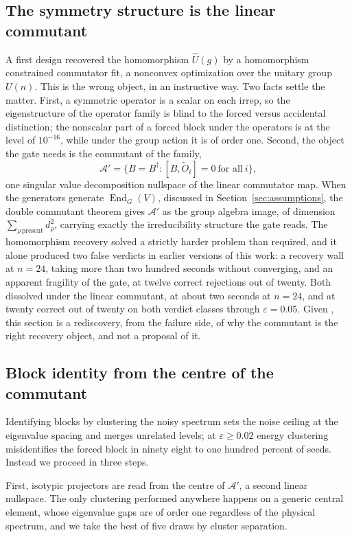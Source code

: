 \documentclass[11pt]{article}
\newcommand{\comm}[2]{[#1,#2]}
\newcommand{\End}{\operatorname{End}}
\begin{document}
\subsection{The symmetry structure is the linear commutant}
A first design recovered the homomorphism $\hat U(g)$ by a homomorphism
constrained commutator fit, a nonconvex optimization over the unitary group
$U(n)$. This is the wrong object, in an instructive way. Two facts settle the
matter. First, a symmetric operator is a scalar on each irrep, so the
eigenstructure of the operator family is blind to the forced versus accidental
distinction; the nonscalar part of a forced block under the operators is at the
level of $10^{-16}$, while under the group action it is of order one. Second, the
object the gate needs is the commutant of the family,
\[
\mathcal{A}'=\{B=B^\dagger:\comm{B}{\tilde O_i}=0\ \text{for all}\ i\},
\]
one singular value decomposition nullspace of the linear commutator map. When the
generators generate $\End_G(V)$, discussed in Section~\ref{sec:assumptions}, the
double commutant theorem gives $\mathcal{A}'$ as the group algebra image, of
dimension $\sum_{\rho\,\mathrm{present}}d_\rho^2$, carrying exactly the
irreducibility structure the gate reads. The homomorphism recovery solved a
strictly harder problem than required, and it alone produced two false verdicts
in earlier versions of this work: a recovery wall at $n=24$, taking more than two
hundred seconds without converging, and an apparent fragility of the gate, at
twelve correct rejections out of twenty. Both dissolved under the linear
commutant, at about two seconds at $n=24$, and at twenty correct out of twenty on
both verdict classes through $\varepsilon=0.05$. Given \cite{MM2011}, this section
is a rediscovery, from the failure side, of why the commutant is the right
recovery object, and not a proposal of it.

\subsection{Block identity from the centre of the commutant}\label{sec:blockid}
Identifying blocks by clustering the noisy spectrum sets the noise ceiling at the
eigenvalue spacing and merges unrelated levels; at $\varepsilon\ge0.02$ energy
clustering misidentifies the forced block in ninety eight to one hundred percent
of seeds. Instead we proceed in three steps.

First, isotypic projectors are read from the centre of $\mathcal{A}'$, a second
linear nullspace. The only clustering performed anywhere happens on a generic
central element, whose eigenvalue gaps are of order one regardless of the
physical spectrum, and we take the best of five draws by cluster separation.
\end{document}
